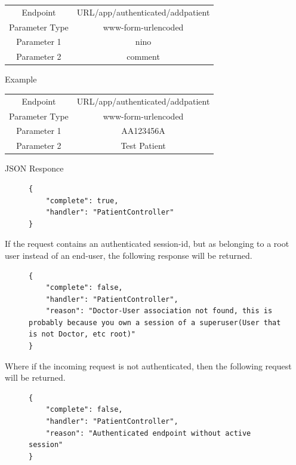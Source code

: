 					\begin{center}
						\begin{tabular}{ |c|c| } 
							\hline
							Endpoint & {{URL}}/app/authenticated/addpatient\\
							Parameter Type & www-form-urlencoded  \\
							Parameter 1 & nino\\
							Parameter 2 & comment  \\
							\hline
						\end{tabular}
					\end{center}
					Example
					\begin{center}
						\begin{tabular}{ |c|c| } 
							\hline
							Endpoint & {{URL}}/app/authenticated/addpatient\\
							Parameter Type & www-form-urlencoded  \\
							Parameter 1 & AA123456A\\
							Parameter 2 & Test Patient  \\
							\hline
						\end{tabular}
					\end{center}
					JSON Responce
					\begin{figure}[H]
						\iftrue
						\begin{lstlisting}[]
{
	"complete": true,
	"handler": "PatientController"
}
						\end{lstlisting}
					\end{figure}
					If the request contains an authenticated session-id, but as belonging to a root user instead of an 
					end-user, the following response will be returned.
					\begin{figure}[H]
						\iftrue
						\begin{lstlisting}[]
{
	"complete": false,
	"handler": "PatientController",
	"reason": "Doctor-User association not found, this is probably because you own a session of a superuser(User that is not Doctor, etc root)"
}
						\end{lstlisting}
					\end{figure}
					Where if the incoming request is not authenticated, then the following request will be returned.
					\begin{figure}[H]
						\iftrue
						\begin{lstlisting}[]
{
	"complete": false,
	"handler": "PatientController",
	"reason": "Authenticated endpoint without active session"
}
						\end{lstlisting}
					\end{figure}
